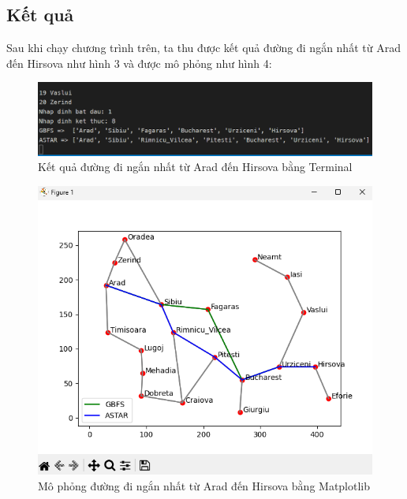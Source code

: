 \documentclass[a4paper, 11pt]{article}
\begin{document}
\subsection{Kết quả}
Sau khi chạy chương trình trên, ta thu được kết quả đường đi ngắn nhất từ Arad đến Hirsova như hình 3 và được mô phỏng như hình 4:
\begin{figure}[ht]
  \centering
  \includegraphics[width=\textwidth,height=\textheight,keepaspectratio]{terminal_result.png}
  \caption{Kết quả đường đi ngắn nhất từ Arad đến Hirsova bằng Terminal}
\end{figure}
\begin{figure}[ht]
  \centering
  \includegraphics[width=.75\textwidth,height=.75\textheight,keepaspectratio]{figure_result.png}
  \caption{Mô phỏng đường đi ngắn nhất từ Arad đến Hirsova bằng Matplotlib}
\end{figure}
\clearpage
\end{document}
